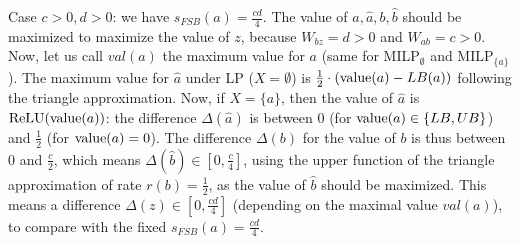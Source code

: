 \iffalse
\begin{figure}[t!]
	\begin{centering}
	\begin{tikzpicture}[scale=1, >=stealth]
		
		\draw[->] (-5,0) -- (4,0) node[right] {$a$};
		\draw[->] (0,-1) -- (0,3) node[above] {$\hat{a}$};
		
		\draw[line width=0.4mm, blue] (-3,0) -- (0,0);
		\draw[thick, blue] (0,0) -- (2.5,2.5) node[below, shift={(-1.1,-1.9)}] {$\hat{a} = \ReLU(a)$};
		\draw[thick, blue] (-3,0) -- (2.5,2.5) node[above, shift={(-5.7,-2)}] {$\hat{a} = r(a) (a-\LB)$};
		
		\draw[dashed] (2.5,0) -- (2.5,2.5) -- (0,2.5); %
		\node[below left] at (0,0) {$0$};
		
		
		\foreach \x in {2.5}
		\draw[shift={(\x,0)}] (0,0.1) -- (0,-0.1) node[below] {$\UB$};
		\foreach \x in {-3}
		\draw[shift={(\x,0)}] (0,0.1) -- (0,-0.1) node[below] {$\LB$};
	
		\foreach \y in {2.5}
		\draw[shift={(0,\y)}] (0.1,0) -- (-0.1,0) node[left] {$\UB$};
		
		
	\end{tikzpicture}
		\caption{Triangle approximation with $r(a)=\frac{1}{2}$
		\vspace{-0.3cm}}
	\label{triangle}
	\end{centering}
	\end{figure}
\fi




Case $c>0,d>0$: we have $s_{FSB}(a)=\frac{cd}{4}$.
The value of $a,\hat{a},b,\hat{b}$ should be maximized to maximize the value of $z$, because $W_{bz}=d>0$ and $W_{ab}=c>0$. 
Now, let us call $val(a)$ the maximum value for $a$ 
(same for MILP$_\emptyset$ and MILP$_{\{a\}}$).
The maximum value for $\hat{a}$ under LP ($X=\emptyset$) is 
$\frac{1}{2} \cdot ({\textrm{value}}(a)-LB(a))$ following the triangle approximation. 
Now, if $X=\{a\}$, then the value of $\hat{a}$ is $\mathrm{ReLU}({\textrm{value}}(a))$: the difference 
$\Delta(\hat{a})$ is between 0 (for ${\textrm{value}}(a)\in \{LB,UB\}$) and $\frac{1}{2}$ (for ${\textrm{value}}(a)=0$). The difference $\Delta(b)$ for the value of $b$ is thus between 0 and $\frac{c}{2}$, which means $\Delta(\hat{b}) \in [0, \frac{c}{4}]$, using the upper function of the triangle approximation of rate $r(b)=\frac{1}{2}$, as the value of $\hat{b}$ should be maximized.
This means a difference $\Delta(z) \in [0, \frac{cd}{4}]$ 
(depending on the maximal value $val(a)$), to compare with the fixed 
$s_{FSB}(a)=\frac{cd}{4}$.


